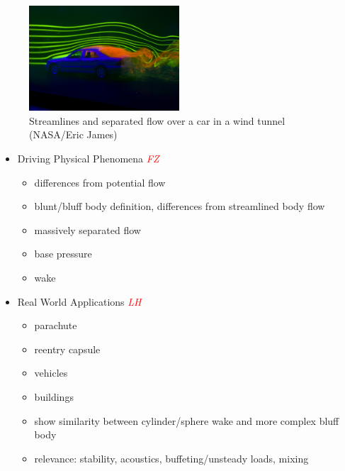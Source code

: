\documentclass[journal]{new-aiaa}
\begin{document}
\begin{figure}[H]
\begin{center}
\includegraphics[width=0.5\textwidth]{Images/logan/james_CarWakePIV.jpg}
\caption{ Streamlines and separated flow over a car in a wind tunnel (NASA/Eric James) }
\label{fig:carwake}
\end{center}
\end{figure}















\begin{itemize}
    \item Driving Physical Phenomena \textcolor{red}{\emph{FZ}}

    \begin{itemize}
        \item differences from potential flow
        \item blunt/bluff body definition, differences from streamlined body flow
        \item massively separated flow
        \item base pressure
        \item wake
    \end{itemize}
    \item Real World Applications \textcolor{red}{\emph{LH}}
    \begin{itemize}
        \item parachute
        \item reentry capsule
        \item vehicles
        \item buildings
        \item show similarity between cylinder/sphere wake and more complex bluff body
        \item relevance: stability, acoustics, buffeting/unsteady loads, mixing
    \end{itemize}
\end{itemize}
\end{document}
